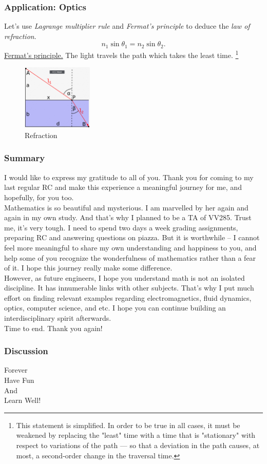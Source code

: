 \documentclass[10pt, t, allowdisplaybreaks]{beamer}
\begin{document}
\begin{frame}
    \frametitle{Application: Optics}
    Let's use \textit{Lagrange multiplier rule} and \textit{Fermat's principle} to deduce the \textit{law of refraction}.
    $$n_1\sin\theta_1=n_2\sin\theta_2.$$
    \href{https://en.wikipedia.org/wiki/Fermat\%27s_principle}{Fermat's principle.} The light travels the path which takes the least time. \footnote[frame]{This statement is simplified. In order to be true in all cases, it must be weakened by replacing the "least" time with a time that is "stationary" with respect to variations of the path — so that a deviation in the path causes, at most, a second-order change in the traversal time.}
    \begin{figure}[H]
        \centering
        \includegraphics[width=0.3\textwidth]{Figures/2020-07-29-16-52-32.png}
        \caption{Refraction}
    \end{figure}
\end{frame}

\begin{frame}
    \frametitle{Summary}

    I would like to express my gratitude to all of you. Thank you for coming to my last regular RC and make this experience a meaningful journey for me, and hopefully, for you too.\\[8pt]
    Mathematics is so beautiful and mysterious. I am marvelled by her again and again in my own study. And that's why I planned to be a TA of VV285. Trust me, it's very tough. I need to spend two days a week grading assignments, preparing RC and answering questions on piazza. But it is worthwhile -- I cannot feel more meaningful to share my own understanding and happiness to you, and help some of you recognize the wonderfulness of mathematics rather than a fear of it. I hope this journey really make some difference.
    \\[8pt]
    However, as future engineers, I hope you understand math is not an isolated discipline. It has innumerable links with other subjects. That's why I put much effort on finding relevant examples regarding electromagnetics, fluid dynamics, optics, computer science, and etc. I hope you can continue building an interdisciplinary spirit afterwards.
    \\[8pt]
    Time to end. Thank you again!
\end{frame}

\begin{frame}
    \frametitle{Discussion}
    \vspace{1cm}
    \begin{center}
        \LARGE
        Forever\\
        Have Fun\\
        And\\
        Learn Well!
    \end{center}
\end{frame}
\end{document}
